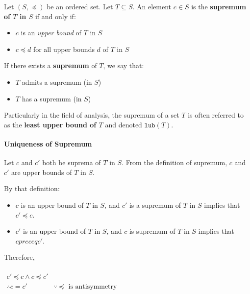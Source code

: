 Let $(S, \preceq)$ be an ordered set. Let $T \subseteq S$. An element
$c \in S$ is the \textbf{supremum of $T$ in $S$} if and only if:

\begin{itemize}
\item $c$ is an \textit{upper bound} of $T$ in $S$
\item $c \preceq d$ for all upper bounds $d$ of $T$ in $S$
\end{itemize}

If there exists a \textbf{supremum} of $T$, we say that:

\begin{itemize}
\item $T$ admits a supremum (in $S$)
\item $T$ has a supremum (in $S$)
\end{itemize}


Particularly in the field of analysis, the supremum of a set $T$ is
often referred to as the \textbf{least upper bound of $T$} and denoted
$\mathtt{lub}(T)$.


\paragraph{Uniqueness of Supremum}

Let $c$ and $c'$ both be suprema of $T$ in $S$. From the definition of
supremum, $c$ and $c'$ are upper bounds of $T$ in $S$.

By that definition:

\begin{itemize}
\item $c$ is an upper bound of $T$ in $S$, and $c'$ is a supremum of
  $T$ in $S$ implies that $c' \preceq c$.
\item $c'$ is an upper bound of $T$ in $S$, and $c$ is supremum of $T$
  in $S$ implies that $c preceq c'$.
\end{itemize}

Therefore,

\begin{math}
  \begin{array}{ll}
    \\
    c' \preceq c \land c \preceq c'\\
    \therefore c = c' & \because \preceq \text{ is antisymmetry}\\
    \\
  \end{array}
\end{math}

